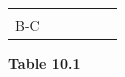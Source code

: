 {{\begin{center}
\begin{xtabular}[t]{|l|l|l|l|l|l|}
         &
         &
         &
         &
     \tabularnewline{}
        B-C &
         &
         &
         &
         &
     \tabularnewline{}
    \end{xtabular}
      \end{center}
    \begin{center}{\small\bfseries Table 10.1}\end{center}
}}
